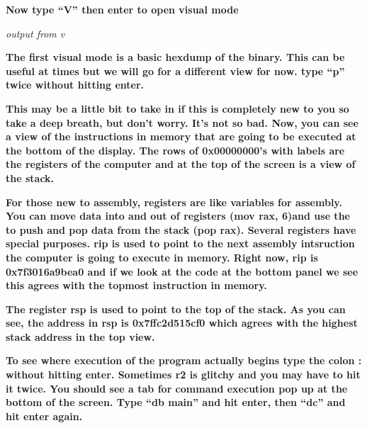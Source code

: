 \documentclass[letterpaper]{article}
\newcommand{\sitfig}[3]{
\begin{figure}[H]
\centering
\makebox[\textwidth][c]{
#2
}
\label{#1}
\end{figure}
}
\newcommand{\sitgfx}[4][scale=1.0]{
\sitfig{#3}{\texttt{[image: \#2]}}{#4}
}
\begin{document}
  
\sitgfx[width=5.8335in,height=3.6457in]{FINALWORKINGDOCFORMERLYPRECURSOR-img075.png}{fig:unk}{TODO CAPTION}
 

\textbf{Now type ``V'' then enter to open visual mode}

  
\sitgfx[width=5.8335in,height=3.6457in]{FINALWORKINGDOCFORMERLYPRECURSOR-img076.png}{fig:unk}{TODO CAPTION}
 

\textit{output from v}

\textbf{The first visual mode is a basic hexdump of the binary. This can be useful at times but we will go for a
different view for now. type ``p'' twice without hitting enter.}

  
\sitgfx[width=5.8335in,height=3.6457in]{FINALWORKINGDOCFORMERLYPRECURSOR-img077.png}{fig:unk}{TODO CAPTION}
 

\textbf{This may be a little bit to take in if this is completely new to you so take a deep breath, but don't worry.
It's not so bad. Now, you can see a view of the instructions in memory that are going to be executed at the bottom of
the display. The rows of 0x00000000's with labels are the registers of the computer and at the top of the screen is a
view of the stack.}

  
\sitgfx[width=5.8335in,height=3.6457in]{FINALWORKINGDOCFORMERLYPRECURSOR-img027.png}{fig:unk}{TODO CAPTION}
 

\textbf{For those new to assembly, registers are like variables for assembly. You can move data into and out of
registers (mov rax, 6)and use the to push and pop data from the stack (pop rax). Several registers have special
purposes. rip is used to point to the next assembly intsruction the computer is going to execute in memory. Right now,
rip is 0x7f3016a9bea0 and if we look at the code at the bottom panel we see this agrees with the topmost instruction in
memory.}

  
\sitgfx[width=5.8335in,height=3.6457in]{FINALWORKINGDOCFORMERLYPRECURSOR-img078.png}{fig:unk}{TODO CAPTION}
 

\textbf{The register rsp is used to point to the top of the stack. As you can see, the address in rsp is 0x7ffc2d515cf0
which agrees with the highest stack address in the top view.}

  
\sitgfx[width=5.8335in,height=3.6457in]{FINALWORKINGDOCFORMERLYPRECURSOR-img079.png}{fig:unk}{TODO CAPTION}
 

\textbf{To see where execution of the program actually begins type the colon : without hitting enter. Sometimes r2 is
glitchy and you may have to hit it twice. You should see a tab for command execution pop up at the bottom of the
screen. Type ``db main'' and hit enter, then ``dc'' and hit enter again.}
\end{document}

